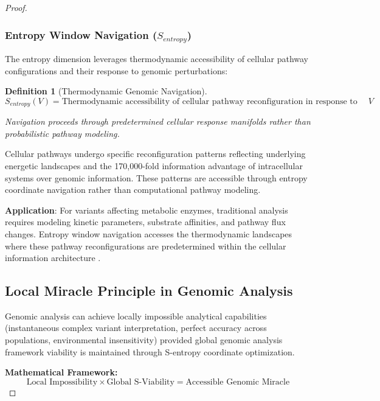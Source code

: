 \documentclass[12pt,a4paper]{article}
\newtheorem{definition}[theorem]{Definition}
\begin{document}
\begin{proof}
\subsubsection{Entropy Window Navigation ($S_{entropy}$)}

The entropy dimension leverages thermodynamic accessibility of cellular pathway configurations and their response to genomic perturbations:

\begin{definition}[Thermodynamic Genomic Navigation]
$$S_{entropy}(V) = \text{Thermodynamic accessibility of cellular pathway reconfiguration in response to variant $V$}$$

Navigation proceeds through predetermined cellular response manifolds rather than probabilistic pathway modeling.
\end{definition}

Cellular pathways undergo specific reconfiguration patterns reflecting underlying energetic landscapes and the 170,000-fold information advantage of intracellular systems over genomic information. These patterns are accessible through entropy coordinate navigation rather than computational pathway modeling.

\textbf{Application}: For variants affecting metabolic enzymes, traditional analysis requires modeling kinetic parameters, substrate affinities, and pathway flux changes. Entropy window navigation accesses the thermodynamic landscapes where these pathway reconfigurations are predetermined within the cellular information architecture \cite{nelson2017lehninger, voet2016biochemistry}.

\subsection{Local Miracle Principle in Genomic Analysis}

\begin{principle}
Genomic analysis can achieve locally impossible analytical capabilities (instantaneous complex variant interpretation, perfect accuracy across populations, environmental insensitivity) provided global genomic analysis framework viability is maintained through S-entropy coordinate optimization.
\end{principle}

\textbf{Mathematical Framework:}
$$\text{Local Impossibility} \times \text{Global S-Viability} = \text{Accessible Genomic Miracle}$$


\end{proof}
\end{document}
